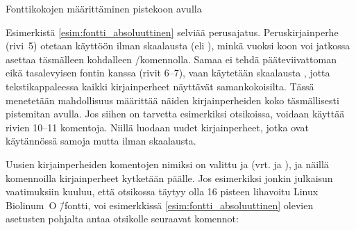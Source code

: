 \begin{esimerkki}
\caption{Fonttikokojen määrittäminen pistekoon avulla}
\label{esim:fontti_absoluuttinen}
\end{esimerkki}

Esimerkistä \ref{esim:fontti_absoluuttinen} selviää perus\-ajatus.
Peruskirjainperhe (rivi~5) otetaan käyttöön ilman skaalausta (eli
), minkä vuoksi koon voi jatkossa asettaa täsmälleen
kohdalleen \-/komennolla. Samaa ei tehdä
pääteviivattoman eikä tasalevyisen fontin kanssa (rivit 6--7), vaan
käytetään skaalausta , jotta tekstikappaleessa
kaikki kirjainperheet näyttävät samankokoisilta. Tässä menetetään
mahdollisuus määrittää näiden kirjainperheiden koko täsmällisesti
pistemitan avulla. Jos siihen on tarvetta esimerkiksi otsikoissa,
voidaan käyttää rivien 10--11 komentoja. Niillä luodaan uudet
kirjainperheet, jotka ovat käytännössä samoja mutta ilman skaalausta.

Uusien kirjainperheiden komentojen nimiksi on valittu  ja  (vrt. 
ja ), ja näillä komennoilla kirjainperheet
kytketään päälle. Jos esimerkiksi jonkin julkaisun vaatimuksiin kuuluu,
että otsikossa täytyy olla 16 pisteen lihavoitu Linux Biolinum~O
\=/fontti, voi esimerkkissä \ref{esim:fontti_absoluuttinen} olevien
asetusten pohjalta antaa otsikolle seuraavat komennot:

